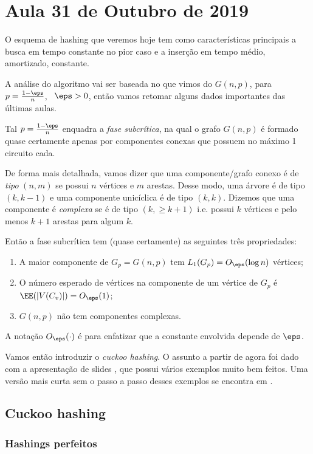 \section{Aula 31 de Outubro de 2019}
\label{2019_10_31}

O esquema de hashing que veremos hoje tem como características principais a busca em tempo constante no pior caso e a inserção em tempo médio, amortizado, constante.

A análise do algoritmo vai ser baseada no que vimos do $G(n,p)$, para $p = \frac{1-\eps}{n}$, \ $\eps>0$, então vamos retomar alguns dados importantes das últimas aulas.

Tal $p = \frac{1-\eps}{n}$ enquadra a \emph{fase subcrítica}, na qual o grafo $G(n,p)$ é formado quase certamente apenas por componentes conexas que possuem no máximo 1 circuito cada.

De forma mais detalhada, vamos dizer que uma componente/grafo conexo é de \emph{tipo} $(n,m)$ se possui $n$ vértices e $m$ arestas. Desse modo, uma árvore é de tipo $(k,k-1)$ e uma componente unicíclica é de tipo $(k,k)$. Dizemos que uma componente é \emph{complexa} se é de tipo $(k, \geq k+1)$ i.e. possui $k$ vértices e pelo menos $k+1$ arestas para algum $k$.

Então a fase subcrítica tem (quase certamente) as seguintes três propriedades:

\begin{enumerate}
	\item A maior componente de $G_p = G(n,p)$ tem $L_1(G_p) = O_\eps(\log n)$ vértices;
	\item \label{tamanho medio}O número esperado de vértices na componente de um vértice de $G_p$ é $\EE(|V(C_v)|) = O_\eps(1)$;
	\item \label{complexa}$G(n,p)$ não tem componentes complexas.
\end{enumerate}
A notação $O_\eps(\cdot)$ é para enfatizar que a constante envolvida depende de $\eps$.

Vamos então introduzir o \emph{cuckoo hashing}. O assunto a partir de agora foi dado com a apresentação de slides \cite{1}, que possui vários exemplos muito bem feitos. Uma versão mais curta sem o passo a passo desses exemplos se encontra em \cite{2}.


\subsection{Cuckoo hashing} 

\subsubsection{Hashings perfeitos}

